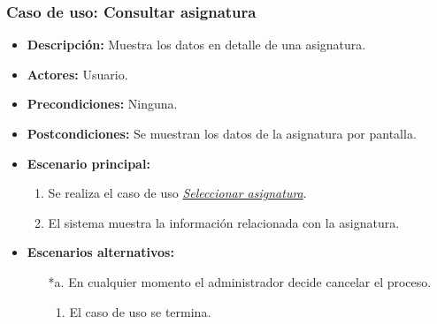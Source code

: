 \subsubsection*{Caso de uso: Consultar asignatura}
\begin{itemize}
\item{\bf Descripción:} Muestra los datos en detalle de una asignatura.
\item{\bf Actores:} Usuario.
\item{\bf Precondiciones:} Ninguna.
\item{\bf Postcondiciones:} Se muestran los datos de la asignatura por pantalla.
\item{\bf Escenario principal:} 
	\begin{enumerate}
	\item Se realiza el caso de uso {\em \hyperref[select_asignatura]{Seleccionar asignatura}}.
	\item El sistema muestra la información relacionada con la asignatura.
	\end{enumerate}
\item{\bf Escenarios alternativos:}
	\begin{itemize}
	\item[*a.] En cualquier momento el administrador decide cancelar el proceso.
		\begin{enumerate}
		\item El caso de uso se termina.
		\end{enumerate}
	\end{itemize}
\end{itemize}


